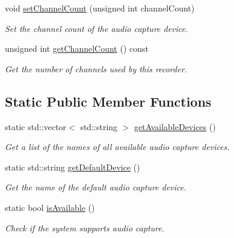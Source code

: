 \begin{DoxyCompactItemize}
void \hyperlink{classsf_1_1_sound_recorder_ae4e22ba67d12a74966eb05fad55a317c}{set\+Channel\+Count} (unsigned int channel\+Count)
\begin{DoxyCompactList}\small\item\em Set the channel count of the audio capture device. \end{DoxyCompactList}\item 
unsigned int \hyperlink{classsf_1_1_sound_recorder_a610e98e7a73b316ce26b7c55234f86e9}{get\+Channel\+Count} () const
\begin{DoxyCompactList}\small\item\em Get the number of channels used by this recorder. \end{DoxyCompactList}\end{DoxyCompactItemize}
\subsection*{Static Public Member Functions}
\begin{DoxyCompactItemize}
\item 
static std\+::vector$<$ std\+::string $>$ \hyperlink{classsf_1_1_sound_recorder_a26198c5c11efcd61f426f326fe314afe}{get\+Available\+Devices} ()
\begin{DoxyCompactList}\small\item\em Get a list of the names of all available audio capture devices. \end{DoxyCompactList}\item 
static std\+::string \hyperlink{classsf_1_1_sound_recorder_ad1d450a80642dab4b632999d72a1bf23}{get\+Default\+Device} ()
\begin{DoxyCompactList}\small\item\em Get the name of the default audio capture device. \end{DoxyCompactList}\item 
static bool \hyperlink{classsf_1_1_sound_recorder_aab2bd0fee9e48d6cfd449b1cb078ce5a}{is\+Available} ()
\begin{DoxyCompactList}\small\item\em Check if the system supports audio capture. \end{DoxyCompactList}\end{DoxyCompactItemize}
